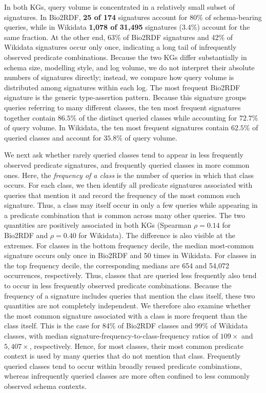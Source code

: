 \documentclass[sw]{iosart2x}
\begin{document}
In both KGs, query volume is concentrated in a relatively small subset of signatures. In Bio2RDF, \textbf{25 of 174} signatures account for 80\% of schema-bearing queries, while in Wikidata \textbf{1{,}078 of 31{,}495} signatures (3.4\%) account for the same fraction. At the other end, 63\% of Bio2RDF signatures and 42\% of Wikidata signatures occur only once, indicating a long tail of infrequently observed predicate combinations. Because the two KGs differ substantially in schema size, modelling style, and log volume, we do not interpret their absolute numbers of signatures directly; instead, we compare how query volume is distributed among signatures within each log.
The most frequent Bio2RDF signature is the generic type-assertion pattern. Because this signature groups queries referring to many different classes, the ten most frequent signatures together contain $86.5\%$ of the distinct queried classes while accounting for $72.7\%$ of query volume. In Wikidata, the ten most frequent signatures contain $62.5\%$ of queried classes and account for $35.8\%$ of query volume.


We next ask whether rarely queried classes tend to appear in less frequently observed predicate signatures, and frequently queried classes in more common ones. Here, the \emph{frequency of a class} is the number of queries in which that class occurs. For each class, we then identify all predicate signatures associated with queries that mention it and record the frequency of the most common such signature. Thus, a class may itself occur in only a few queries while appearing in a predicate combination that is common across many other queries.
The two quantities are positively associated in both KGs (Spearman $\rho = 0.14$ for Bio2RDF and $\rho = 0.40$ for Wikidata). The difference is also visible at the extremes. For classes in the bottom frequency decile, the median most-common signature occurs only once in Bio2RDF and 50 times in Wikidata. For classes in the top frequency decile, the corresponding medians are 654 and 54{,}072 occurrences, respectively. Thus, classes that are queried less frequently also tend to occur in less frequently observed predicate combinations.
Because the frequency of a signature includes queries that mention the class itself, these two quantities are not completely independent. We therefore also examine whether the most common signature associated with a class is more frequent than the class itself. This is the case for 84\% of Bio2RDF classes and 99\% of Wikidata classes, with median signature-frequency-to-class-frequency ratios of $109\times$ and $5{,}407\times$, respectively. Hence, for most classes, their most common predicate context is used by many queries that do not mention that class. Frequently queried classes tend to occur within broadly reused predicate combinations, whereas infrequently queried classes are more often confined to less commonly observed schema contexts.
\end{document}

